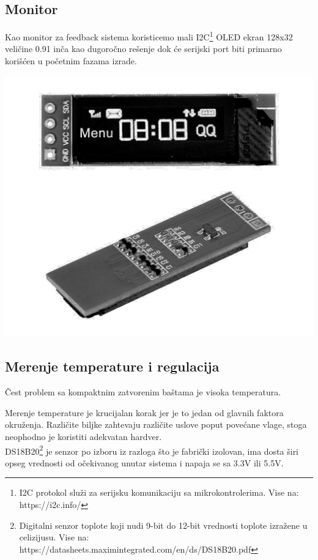 \documentclass[a4paper,11pt]{book}
\begin{document}
\subsection{Monitor}
Kao monitor za feedback sistema koristicemo mali I2C\footnote{I2C protokol služi za serijsku komunikaciju sa mikrokontrolerima. Vise na: https://i2c.info/} OLED ekran 128x32 veličine 0.91 inča kao dugoročno rešenje dok će serijski port biti primarno korišćen u početnim fazama izrade.

\includegraphics[width=\textwidth]{oled.png}

\subsection{Merenje temperature i regulacija}

Čest problem sa kompaktnim zatvorenim baštama je visoka temperatura.

Merenje temperature je krucijalan korak jer je to jedan od glavnih faktora okruženja. Različite biljke zahtevaju različite uslove poput povećane vlage, stoga neophodno je koristiti adekvatan hardver.\\ 

\noindent DS18B20\footnote{Digitalni senzor toplote koji nudi 9-bit do 12-bit vrednosti toplote izražene u celizijusu. Vise na: https://datasheets.maximintegrated.com/en/ds/DS18B20.pdf} je senzor po izboru iz razloga što je fabrički izolovan, ima dosta širi opseg vrednosti od očekivanog unutar sistema i napaja se sa 3.3V ili 5.5V.
\end{document}
